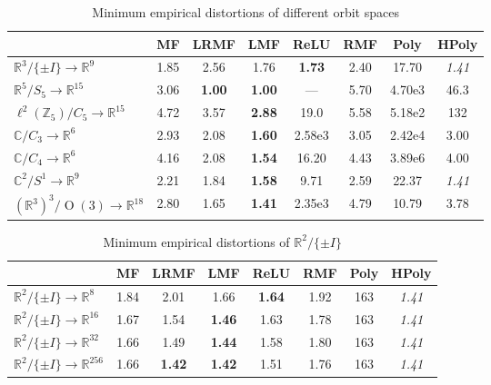 \documentclass{article}
\theoremstyle{plain}
\theoremstyle{definition}
\begin{document}
{\renewcommand{\arraystretch}{1.5}%
\begin{table}[p]
\caption{Minimum empirical distortions of different orbit spaces}
\label{table:results}
\vspace{-6pt}
\centering
\begin{tabular}{|l||c|c|c|c||c|c|c|}
\hline
\textbf{}  & \textbf{MF} & \textbf{LRMF} & \textbf{LMF} & \textbf{ReLU} & \textbf{RMF} & \textbf{Poly} & \textbf{HPoly}\\
\hline
{$\mathbb{R}^{3}/\{\pm I\} \to \mathbb{R}^{9}$} 
   & 1.85 & 2.56 & 1.76 & \textbf{1.73} & 2.40 & 17.70 & \textit{1.41} \\
\hline
\textbf{$\mathbb{R}^5/S_{5} \to \mathbb{R}^{15}$} 
  & 3.06 & \textbf{1.00} & \textbf{1.00} & — & 5.70 & {4.70e3} & {46.3} \\
\hline
\textbf{$\ell^2(\mathbb{Z}_5)/C_5 \to \mathbb{R}^{15}$} 
   & 4.72 & 3.57 & \textbf{2.88} & 19.0 & 5.58 & {5.18{e}{2}} & {132}\\
\hline
\textbf{$\mathbb{C}/C_3 \to \mathbb{R}^{6}$} 
   & 2.93 & 2.08 & \textbf{1.60} & 2.58{e}{3} & 3.05  & 2.42{e}{4} & 3.00 \\
\hline
\textbf{$\mathbb{C}/C_4 \to \mathbb{R}^{6}$} 
   & 4.16 & 2.08 & \textbf{1.54} & 16.20 & 4.43 & 3.89{e}{6} & 4.00 \\
\hline
\textbf{$ \mathbb{C}^{2}/S^1 \to \mathbb{R}^{9}$} 
  & 2.21 & 1.84 & \textbf{1.58} & 9.71 &  2.59 & 22.37 & \textit{1.41} \\
\hline
\textbf{$(\mathbb{R}^{3})^{3}/\operatorname{O}(3) \to \mathbb{R}^{18}$} 
  & 2.80 & 1.65 & \textbf{1.41} & 2.35{e}{3} & 4.79 & 10.79 & 3.78 \\
\hline
\end{tabular}
\end{table}

\begin{table}[p]
\caption{Minimum empirical distortions of $\mathbb{R}^2 / \{\pm I\}$}
\label{table:Z2_scaling}
\vspace{-6pt}
\centering
\begin{tabular}{|l||c|c|c|c||c|c|c|}
\hline
\textbf{} & \textbf{MF} & \textbf{LRMF} & \textbf{LMF} & \textbf{ReLU} & \textbf{RMF} & \textbf{Poly} & \textbf{HPoly} \\
\hline
\textbf{$\mathbb{R}^2/\{\pm I\} \to \mathbb{R}^8$} 
  & 1.84 & 2.01 & 1.66 & \textbf{1.64} & 1.92 & 163 & \textit{1.41}\\
\hline
\textbf{$\mathbb{R}^2/\{\pm I\} \to \mathbb{R}^{16}$} 
  & 1.67 & 1.54 & \textbf{1.46} & 1.63 & 1.78 & 163 & \textit{1.41}\\
\hline
\textbf{$\mathbb{R}^2/\{\pm I\} \to \mathbb{R}^{32}$} 
  & 1.66 &  1.49 & \textbf{1.44} & 1.58 & 1.80 & 163 & \textit{1.41}\\
\hline
\textbf{$\mathbb{R}^2/\{\pm I\} \to \mathbb{R}^{256}$} 
  & 1.66 & \textbf{1.42} & \textbf{1.42} & 1.51 & 1.76 & 163 & \textit{1.41}\\
\hline
\end{tabular}
\end{table}

}
\end{document}

